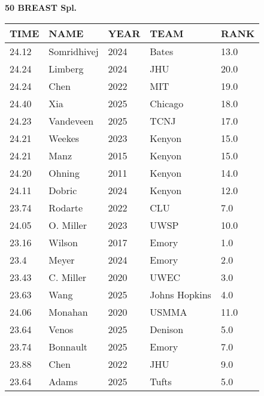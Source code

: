 \begin{table}[H]
\centering
\begin{minipage}[t]{0.6\textwidth}
\centering
\textbf{50 BREAST Spl.}\\[0.1cm]
\begin{tabular}{@{}p{1.8cm}p{2.8cm}p{1.2cm}p{1.4cm}p{0.8cm}@{}}
\hline
    \textbf{TIME} & \textbf{NAME} & \textbf{YEAR} & \textbf{TEAM} & \textbf{RANK} \\
\hline
    24.12 & Somridhivej & 2024 & Bates & 13.0 \\
    24.24 & Limberg & 2024 & JHU & 20.0 \\
    24.24 & Chen & 2022 & MIT & 19.0 \\
    24.40 & Xia & 2025 & Chicago & 18.0 \\
    24.23 & Vandeveen & 2025 & TCNJ & 17.0 \\
    24.21 & Weekes & 2023 & Kenyon & 15.0 \\
    24.21 & Manz & 2015 & Kenyon & 15.0 \\
    24.20 & Ohning & 2011 & Kenyon & 14.0 \\
    24.11 & Dobric & 2024 & Kenyon & 12.0 \\
    23.74 & Rodarte & 2022 & CLU & 7.0 \\
    24.05 & O. Miller & 2023 & UWSP & 10.0 \\
    23.16 & Wilson & 2017 & Emory & 1.0 \\
    23.4 & Meyer & 2024 & Emory & 2.0 \\
    23.43 & C. Miller & 2020 & UWEC & 3.0 \\
    23.63 & Wang & 2025 & Johns Hopkins & 4.0 \\
    24.06 & Monahan & 2020 & USMMA & 11.0 \\
    23.64 & Venos & 2025 & Denison & 5.0 \\
    23.74 & Bonnault & 2025 & Emory & 7.0 \\
    23.88 & Chen & 2022 & JHU & 9.0 \\
    23.64 & Adams & 2025 & Tufts & 5.0 \\
\hline
\end{tabular}
\end{minipage}
\end{table}

